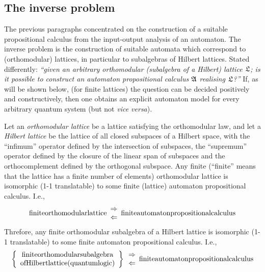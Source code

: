 \documentclass{article}
\begin{document}
\subsection{The inverse problem}
The previous paragraphs concentrated on the construction of a suitable
propositional calculus from the input-output analysis of an automaton.
The inverse problem is the construction of suitable automata which
correspond to (orthomodular) lattices, in particular to
subalgebras of Hilbert lattices.
Stated differently:
{\em ``given an arbitrary orthomodular (subalgebra of a Hilbert)
lattice ${\frak L}$;
is it possible to construct an automaton propositional calculus ${\frak
A}
$
realising ${\frak L}$?''}
If, as will be shown below, (for finite lattices) the question can be
decided positively and
constructively, then one obtains an explicit automaton model for every
arbitrary quantum system (but not {\it vice versa}).


Let an {\em orthomodular lattice} be a lattice satisfying the
orthomodular law, and let a {\em Hilbert lattice} be the lattice
of all closed subspaces of a Hilbert space, with the ``infimum''
operator defined by the intersection of subspaces, the ``supremum''
operator defined by the closure of the linear span of subspaces and
the orthocomplement defined by the orthogonal subspace.
 Any finite
 (``finite''
 means
that the lattice has a finite number of elements)
 orthomodular
 lattice is isomorphic (1-1 translatable) to some finite  (lattice)
automaton
 propositional calculus. I.e.,
 \begin{equation}
 {\rm finite orthomodular lattice}
 \begin{array}{c}\Rightarrow\\ \Leftarrow
\end{array}
{\rm finite automaton propositional calculus}
 \end{equation}
Threfore,
 any finite orthomodular subalgebra of a Hilbert
 lattice is isomorphic (1-1 translatable) to some finite automaton
 propositional calculus. I.e.,
 \begin{equation}
\left\{ \begin{array}{c}
{ \rm finite orthomodular subalgebra }\\
{\rm of Hilbert lattice (quantum logic) }
\end{array} \right\}
 \begin{array}{c}\Rightarrow\\ \Leftarrow \end{array}
{\rm finite automaton propositional calculus}
\end{equation}
\end{document}

